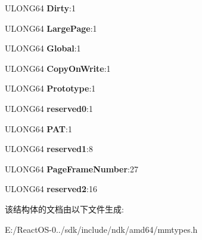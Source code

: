 \begin{DoxyCompactItemize}
\item 
\mbox{\label{struct___m_m_p_t_e___h_a_r_d_w_a_r_e___l_a_r_g_e_p_a_g_e_a21f5785ee1b0ee3f587f21a9ce03b1c4}} 
U\+L\+O\+N\+G64 {\bfseries Dirty}\+:1
\item 
\mbox{\label{struct___m_m_p_t_e___h_a_r_d_w_a_r_e___l_a_r_g_e_p_a_g_e_a00a0f841dd813c82d7341949ccaadc5e}} 
U\+L\+O\+N\+G64 {\bfseries Large\+Page}\+:1
\item 
\mbox{\label{struct___m_m_p_t_e___h_a_r_d_w_a_r_e___l_a_r_g_e_p_a_g_e_a257f0077a0a8d7d3230b3ec65ed96142}} 
U\+L\+O\+N\+G64 {\bfseries Global}\+:1
\item 
\mbox{\label{struct___m_m_p_t_e___h_a_r_d_w_a_r_e___l_a_r_g_e_p_a_g_e_aad72ff18f29552c6f9fa0bb87e9651ef}} 
U\+L\+O\+N\+G64 {\bfseries Copy\+On\+Write}\+:1
\item 
\mbox{\label{struct___m_m_p_t_e___h_a_r_d_w_a_r_e___l_a_r_g_e_p_a_g_e_a7ed604dc91459fa79d5e9b114316607b}} 
U\+L\+O\+N\+G64 {\bfseries Prototype}\+:1
\item 
\mbox{\label{struct___m_m_p_t_e___h_a_r_d_w_a_r_e___l_a_r_g_e_p_a_g_e_a79f1b2b0578daf651c938687f4a32998}} 
U\+L\+O\+N\+G64 {\bfseries reserved0}\+:1
\item 
\mbox{\label{struct___m_m_p_t_e___h_a_r_d_w_a_r_e___l_a_r_g_e_p_a_g_e_aa61b2a440d3a88863c2f99532ad64e1a}} 
U\+L\+O\+N\+G64 {\bfseries P\+AT}\+:1
\item 
\mbox{\label{struct___m_m_p_t_e___h_a_r_d_w_a_r_e___l_a_r_g_e_p_a_g_e_abdf27a6cb388b156cf595c0d5dd5f981}} 
U\+L\+O\+N\+G64 {\bfseries reserved1}\+:8
\item 
\mbox{\label{struct___m_m_p_t_e___h_a_r_d_w_a_r_e___l_a_r_g_e_p_a_g_e_af08703abeac4a88bec482486984f6043}} 
U\+L\+O\+N\+G64 {\bfseries Page\+Frame\+Number}\+:27
\item 
\mbox{\label{struct___m_m_p_t_e___h_a_r_d_w_a_r_e___l_a_r_g_e_p_a_g_e_a89d1b6384ad23586a4b879090766fdfa}} 
U\+L\+O\+N\+G64 {\bfseries reserved2}\+:16
\end{DoxyCompactItemize}


该结构体的文档由以下文件生成\+:\begin{DoxyCompactItemize}
\item 
E\+:/\+React\+O\+S-\/0../sdk/include/ndk/amd64/mmtypes.\+h\end{DoxyCompactItemize}
